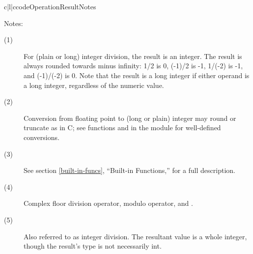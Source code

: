 \begin{tableiii}{c|l|c}{code}{Operation}{Result}{Notes}
  \hline
  \hline
  \hline
\end{tableiii}

\noindent
Notes:
\begin{description}

\item[(1)]
For (plain or long) integer division, the result is an integer.
The result is always rounded towards minus infinity: 1/2 is 0,
(-1)/2 is -1, 1/(-2) is -1, and (-1)/(-2) is 0.  Note that the result
is a long integer if either operand is a long integer, regardless of
the numeric value.

\item[(2)]
Conversion from floating point to (long or plain) integer may round or
truncate as in C; see functions  and
 in the  module
for well-defined conversions.

\item[(3)]
See section \ref{built-in-funcs}, ``Built-in Functions,'' for a full
description.

\item[(4)]
Complex floor division operator, modulo operator, and .


\item[(5)]
Also referred to as integer division.  The resultant value is a whole integer,
though the result's type is not necessarily int.
\end{description}

